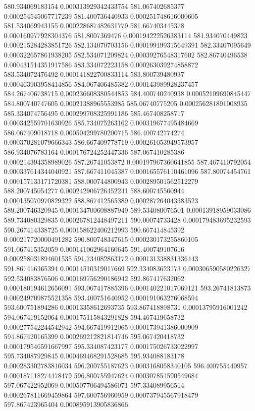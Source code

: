 {580.934069183154 0.000313929342433754
581.067402685377 0.000254545067717239
581.400736440933 0.000251748616000605
581.534069943155 0.000228687482631779
581.667403445378 0.000160977928304376
581.8007369476 0.000194222526383114
581.934070449823 0.000215284283851726
582.134070703156 0.000199199315649391
582.33407095649 0.000322657861938205
582.534071209824 0.00039276548317602
582.86740496538 0.000431514351917586
583.334072223158 0.000263039274858872
583.534072476492 0.000141822700833114
583.800739480937 0.000463903958414856
584.067406485382 0.000143989928237457
584.267406738715 0.000236608380544853
584.400740240938 0.00052109690845447
584.800740747605 0.00021388965553985
585.06740775205 0.000256281891008935
585.334074756495 0.000299708325991186
585.467408258717 0.000342559701630926
585.734075263162 0.000319677495484669
586.067409018718 0.000504299780200715
586.400742774274 0.000370281079666343
586.667409778719 0.000261053949573957
586.934076783164 0.000176724252447336
587.067410285386 0.000214394358989026
587.26741053872 0.000197967360641855
587.467410792054 0.000337614344040921
587.667411045387 0.000165576110461096
587.80074454761 0.000157133171720381
588.000744800943 0.000289501562512279
588.200745054277 0.000242906726452241
588.600745560944 0.000135070970829322
588.867412565389 0.000287264043383523
589.200746320945 0.000134700608887949
589.534080076501 0.00013918959033086
589.734080329835 0.000267812448497211
590.00074733428 0.000179483695232593
590.267414338725 0.000158622406212993
590.667414845392 0.000217720000491282
590.800748347615 0.000230173255860105
591.067415352059 0.000141062964160645
591.400749107616 0.000258031894601535
591.734082863172 0.000131338831336443
591.867416365394 0.00014510319017669
592.334083623173 0.000306590580226327
592.534083876506 0.000169756290186942
592.867417632062 0.000180194612656091
593.067417885396 0.000140221017069121
593.26741813873 0.000249709875521358
593.400751640952 0.000191063276068594
593.600751894286 0.00013358612693735
593.867418898731 0.00013795916001242
594.067419152064 0.000175115843291828
594.467419658732 0.000277542244542942
594.667419912065 0.000173941386000909
594.867420165399 0.000269212821814746
595.067420418732 0.000179546591667997
595.334087423177 0.000175026733022997
595.734087929845 0.000469468291528685
595.934088183178 0.000283302783816034
596.200755187623 0.0003168058340105
596.400755440957 0.000187118274478479
596.800755947624 0.000307851590549684
597.067422952069 0.000507706494586071
597.334089956514 0.000267811669459864
597.600756960959 0.000737945567918479
597.867423965404 0.000895913905836866
}
